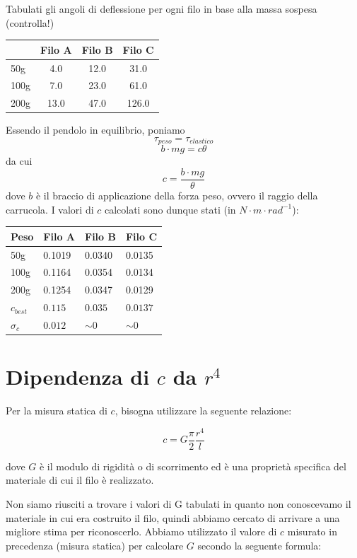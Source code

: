 Tabulati gli angoli di deflessione per ogni filo in base alla massa sospesa (controlla!)\\
\begin{center}
\begin{tabular}{l|ccc}
& Filo A & Filo B & Filo C \\
\midrule
50g & 4.0 & 12.0 & 31.0 \\
100g & 7.0 & 23.0 & 61.0 \\
200g & 13.0 & 47.0 & 126.0 \\
\midrule
\end{tabular}\end{center}
Essendo il pendolo in equilibrio, poniamo
$$ \tau_{peso} = \tau_{elastico} $$
$$ b\cdot mg = c\theta $$
da cui
$$ c = \frac{b\cdot mg}{\theta} $$
dove $b$ è il braccio di applicazione della forza peso, ovvero il raggio della carrucola.
I valori di $c$ calcolati sono dunque stati (in $N\cdot m\cdot rad^{-1}$):

\begin{center}
\begin{tabular}{l|lll}
Peso & Filo A & Filo B & Filo C \\
\midrule
50g & 0.1019 & 0.0340 & 0.0135 \\
100g & 0.1164 & 0.0354 & 0.0134 \\
200g & 0.1254 & 0.0347 & 0.0129 \\
\midrule
$c_{best}$ & $0.115$ & $0.035$& $0.0137$ \\
$\sigma_{c}$ & $0.012$ & $\sim0$ & $\sim 0$ \\
\end{tabular}
\end{center}

\section{Dipendenza di $c$ da $r^4$}

Per la misura statica di $c$, bisogna utilizzare la seguente relazione:

$$ c = G \frac{\pi}{2}\frac{r^4}{l} $$

dove $G$ è il modulo di rigidità o di scorrimento ed è una proprietà specifica del materiale di cui il filo è realizzato.

Non siamo riusciti a trovare i valori di G tabulati in quanto non conoscevamo il materiale in cui era costruito il filo, quindi abbiamo cercato di arrivare a una migliore stima per riconoscerlo. Abbiamo utilizzato il valore di $c$ misurato in precedenza (misura statica) per calcolare $G$ secondo la seguente formula:


